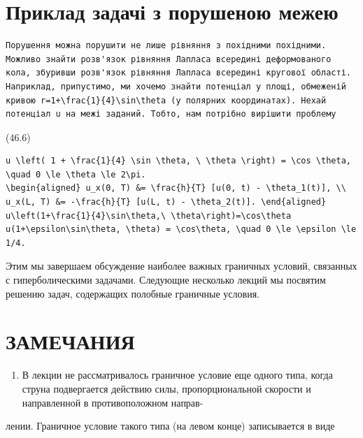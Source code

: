 \documentclass[
  ukrainian,
]{article}
\providecommand{\tightlist}{%
  \setlength{\itemsep}{0pt}\setlength{\parskip}{0pt}}
\begin{document}
\section{Приклад задачі з порушеною
межею}\label{ux43fux440ux438ux43aux43bux430ux434-ux437ux430ux434ux430ux447ux456-ux437-ux43fux43eux440ux443ux448ux435ux43dux43eux44e-ux43cux435ux436ux435ux44e}

\begin{verbatim}
Порушення можна порушити не лише рівняння з похідними похідними. Можливо знайти розв'язок рівняння Лапласа всередині деформованого кола, збуривши розв'язок рівняння Лапласа всередині кругової області. Наприклад, припустимо, ми хочемо знайти потенціал у площі, обмеженій кривою r=1+\frac{1}{4}\sin\theta (у полярних координатах). Нехай потенціал u на межі заданий. Тобто, нам потрібно вирішити проблему
\end{verbatim}

(46.6)

\begin{verbatim}
u \left( 1 + \frac{1}{4} \sin \theta, \ \theta \right) = \cos \theta, \quad 0 \le \theta \le 2\pi.
\begin{aligned} u_x(0, T) &= \frac{h}{T} [u(0, t) - \theta_1(t)], \\ u_x(L, T) &= -\frac{h}{T} [u(L, t) - \theta_2(t)]. \end{aligned}
u\left(1+\frac{1}{4}\sin\theta,\ \theta\right)=\cos\theta
u(1+\epsilon\sin\theta, \theta) = \cos\theta, \quad 0 \le \epsilon \le 1/4.
\end{verbatim}

Этим мы завершаем обсуждение наиболее важных граничных условий,
связанных с гиперболическими задачами. Следующие несколько лекций мы
посвятим решению задач, содержащих полобные граничные условия.

\section{ЗАМЕЧАНИЯ}\label{ux437ux430ux43cux435ux447ux430ux43dux438ux44f-4}

\begin{enumerate}
\def\labelenumi{\arabic{enumi}.}
\tightlist
\item
  В лекции не рассматривалось граничное условие еще одного типа, когда
  струна подвергается действию силы, пропорциональной скорости и
  направленной в противоположном направ-
\end{enumerate}

лении. Граничное условие такого типа (на левом конце) записывается в
виде
\end{document}
